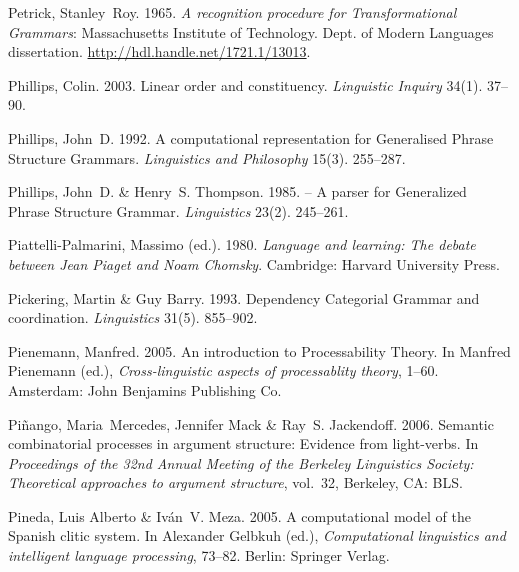 \begin{thebibliography}{1420}
Petrick, Stanley~Roy. 1965.
\newblock \emph{A recognition procedure for {Transformational Grammars}}:
  Massachusetts Institute of Technology. Dept. of Modern Languages
  dissertation.
\newblock \urlprefix\url{http://hdl.handle.net/1721.1/13013}.

Phillips, Colin. 2003.
\newblock Linear order and constituency.
\newblock \emph{Linguistic Inquiry} 34(1). 37--90.

Phillips, John~D. 1992.
\newblock A computational representation for {Generalised Phrase Structure
  Grammars}.
\newblock \emph{Linguistics and Philosophy} 15(3). 255--287.

Phillips, John~D. \& Henry~S. Thompson. 1985.
 -- {A} parser for {Generalized Phrase Structure Grammar}.
\newblock \emph{Linguistics} 23(2). 245--261.

Piattelli-Palmarini, Massimo (ed.). 1980.
\newblock \emph{Language and learning: {The} debate between {Jean Piaget and
  Noam Chomsky}}.
\newblock Cambridge: Harvard University Press.

Pickering, Martin \& Guy Barry. 1993.
\newblock Dependency {Categorial Grammar} and coordination.
\newblock \emph{Linguistics} 31(5). 855--902.

Pienemann, Manfred. 2005.
\newblock An introduction to {Processability Theory}.
\newblock In Manfred Pienemann (ed.), \emph{Cross-linguistic aspects of
  processablity theory}, 1--60. Amsterdam: John Benjamins Publishing Co.

Pi{\~n}ango, Maria~Mercedes, Jennifer Mack \& Ray~S. Jackendoff. 2006.
\newblock Semantic combinatorial processes in argument structure: Evidence from
  light-verbs.
\newblock In \emph{Proceedings of the {32nd Annual Meeting of the Berkeley
  Linguistics Society}: {Theoretical} approaches to argument structure},
  vol.~32, Berkeley, CA: BLS.

Pineda, {Luis Alberto} \& Iv\'an~V. Meza. 2005{}.
\newblock A computational model of the {Spanish} clitic system.
\newblock In Alexander Gelbkuh (ed.), \emph{Computational linguistics and
  intelligent language processing}, 73--82. Berlin: Springer Verlag.


\end{thebibliography}
